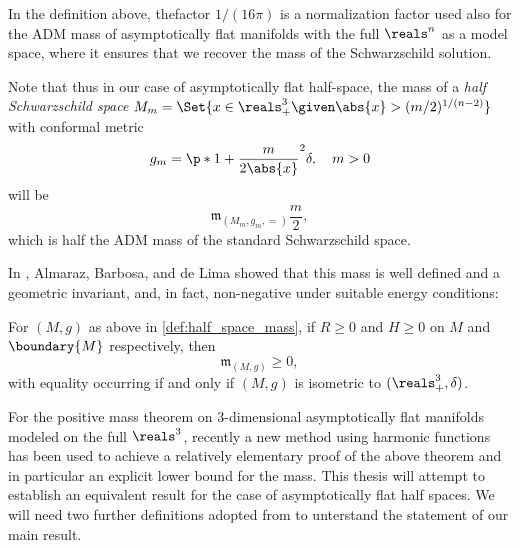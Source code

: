 \documentclass[titlepage,numbers=noenddot,headinclude,oneside,%
footinclude=true,cleardoublepage=empty,%
BCOR=5mm,paper=a4,fontsize=11pt,%
english,%
]{scrartcl}
\newcommand{\mass}[2]{\mathfrak{m}_{(#1,#2)}} %
\begin{document}
\begin{remark}
    In the definition above, thefactor \( 1/(16\pi) \)  is a normalization factor used also for the ADM mass of asymptotically flat manifolds with the full \( \reals^n \) as a model space, where it ensures that we recover the mass of the Schwarzschild solution. 
    
    Note that thus in our case of asymptotically flat half-space, the mass of a \emph{half Schwarzschild space} \( M_m=\Set{x\in \reals^3_+\given \abs{x}>(m/2)^{1/(n-2)}} \) with conformal metric
    \begin{equation*}
        g_m=\p*{1+\frac{m}{2\abs{x}}}^{2}\delta,\quad m>0
    \end{equation*}
    will be
    \begin{equation*}
        \mass{M_m,g_m}=\frac{m}{2},
    \end{equation*}
    which is half the ADM mass of the standard Schwarzschild space.
\end{remark}
In \cite{almarazPositiveMassTheorem2016}, Almaraz, Barbosa, and de Lima showed that this mass is well defined and a geometric invariant, and, in fact, non-negative under suitable energy conditions:
\begin{theorem}\label{thm:positive_mass_theorem_for_half_spaces}
    For \( (M,g) \) as above in \cref{def:half_space_mass}, if \( R\geq 0 \) and \( H\geq 0 \) on \( M \) and \( \boundary{M} \) respectively, then
    \begin{equation*}
        \mass{M}{g}\geq 0,
    \end{equation*}  
    with equality occurring if and only if \( (M,g) \) is isometric to \( (\reals^3_+,\delta) \).
\end{theorem}
For the positive mass theorem on 3-dimensional asymptotically flat manifolds modeled on the full \( \reals^3 \), recently \parencite{brayHarmonicFunctionsMass2019} a new method using harmonic functions has been used to achieve a relatively elementary proof of the above theorem and in particular an explicit lower bound for the mass. This thesis will attempt to establish an equivalent result for the case of asymptotically flat half spaces. We will need two further definitions adopted from \cite{eichmairDoublingAsymptoticallyFlat2023} to unterstand the statement of our main result.
\end{document}
